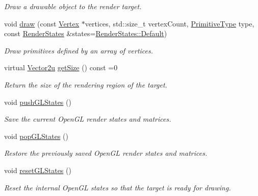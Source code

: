 \begin{DoxyCompactItemize}
\begin{DoxyCompactList}\small\item\em Draw a drawable object to the render target. \end{DoxyCompactList}\item 
void \hyperlink{classsf_1_1_render_target_a976bc94057799eb9f8a18ac5fdfd9b73}{draw} (const \hyperlink{classsf_1_1_vertex}{Vertex} $\ast$vertices, std\+::size\+\_\+t vertex\+Count, \hyperlink{group__graphics_ga5ee56ac1339984909610713096283b1b}{Primitive\+Type} type, const \hyperlink{classsf_1_1_render_states}{Render\+States} \&states=\hyperlink{classsf_1_1_render_states_ad29672df29f19ce50c3021d95f2bb062}{Render\+States\+::\+Default})
\begin{DoxyCompactList}\small\item\em Draw primitives defined by an array of vertices. \end{DoxyCompactList}\item 
virtual \hyperlink{classsf_1_1_vector2}{Vector2u} \hyperlink{classsf_1_1_render_target_a2e5ade2457d9fb4c4907ae5b3d9e94a5}{get\+Size} () const =0
\begin{DoxyCompactList}\small\item\em Return the size of the rendering region of the target. \end{DoxyCompactList}\item 
void \hyperlink{classsf_1_1_render_target_a8d1998464ccc54e789aaf990242b47f7}{push\+G\+L\+States} ()
\begin{DoxyCompactList}\small\item\em Save the current Open\+GL render states and matrices. \end{DoxyCompactList}\item 
void \hyperlink{classsf_1_1_render_target_ad5a98401113df931ddcd54c080f7aa8e}{pop\+G\+L\+States} ()
\begin{DoxyCompactList}\small\item\em Restore the previously saved Open\+GL render states and matrices. \end{DoxyCompactList}\item 
void \hyperlink{classsf_1_1_render_target_aac7504990d27dada4bfe3c7866920765}{reset\+G\+L\+States} ()
\begin{DoxyCompactList}\small\item\em Reset the internal Open\+GL states so that the target is ready for drawing. \end{DoxyCompactList}\end{DoxyCompactItemize}

